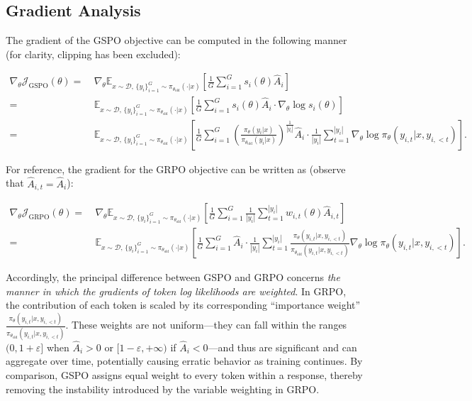 \subsection{Gradient Analysis}
\label{subsec:gradient}

The gradient of the GSPO objective can be computed in the following manner (for clarity, clipping has been excluded):

\begin{align}
\nabla_{\theta} \mathcal{J}_\text{GSPO} (\theta)
=&\ 
\nabla_{\theta} \mathbb{E}_{ x \sim \mathcal{D},\, \{y_i\}_{i=1}^G \sim \pi_{\theta_\text{old}}( \cdot | x) }
\left[ 
\frac{1}{G} \sum_{i=1}^{G} s_{i}(\theta) \widehat{A}_{i}
\right] \\
= &\ 
\mathbb{E}_{ x \sim \mathcal{D},\, \{y_i\}_{i=1}^G \sim \pi_{\theta_\text{old}}( \cdot | x) }
\left[ 
\frac{1}{G} \sum_{i=1}^{G}
s_{i}(\theta) \widehat{A}_{i}
\cdot \nabla_{\theta} \log s_{i}(\theta)
\right] \\
=&\ 
\mathbb{E}_{ x \sim \mathcal{D},\, \{y_i\}_{i=1}^G \sim \pi_{\theta_\text{old}}( \cdot | x) }
\left[ 
\frac{1}{G} \sum_{i=1}^{G} 
\left( \frac{ \pi_{\theta} (y_i | x) }{ \pi_{\theta_\text{old}} (y_i | x)} \right)^{\frac{1}{|y_i|}} \widehat{A}_{i} 
\cdot \frac{1}{|y_i|} \sum_{t=1}^{|y_i|} \nabla_{\theta} \log \pi_{\theta} (y_{i,t} | x, y_{i,<t}) 
\right].
\label{equ:gspo_grad}
\end{align}

For reference, the gradient for the GRPO objective can be written as (observe that $\widehat{A}_{i,t} = \widehat{A}_{i}$):

\begin{align}
\nabla_{\theta} \mathcal{J}_\text{GRPO} (\theta) 
=&\ 
\nabla_{\theta} \mathbb{E}_{ x \sim \mathcal{D},\, \{y_i\}_{i=1}^G \sim \pi_{\theta_\text{old}}( \cdot | x) }
\left[ \frac{1}{G} \sum_{i=1}^{G} \frac{1}{|y_i|} \sum_{t=1}^{|y_i|} 
w_{i,t}(\theta) \widehat{A}_{i,t}
\right] \\
=&\
\mathbb{E}_{ x \sim \mathcal{D},\, \{y_i\}_{i=1}^G \sim \pi_{\theta_\text{old}}( \cdot | x) }
\left[ \frac{1}{G} \sum_{i=1}^{G} \widehat{A}_{i} 
\cdot \frac{1}{|y_i|} \sum_{t=1}^{|y_i|} 
\frac{ \pi_{\theta} (y_{i,t} | x, y_{i,<t}) }{ \pi_{\theta_\text{old}} (y_{i,t} | x,y_{i,<t})} 
\nabla_{\theta} \log \pi_{\theta} (y_{i,t} | x, y_{i,<t})  
\right].
\end{align}

Accordingly, the principal difference between GSPO and GRPO concerns \textit{the manner in which the gradients of token log likelihoods are weighted}. In GRPO, the contribution of each token is scaled by its corresponding ``importance weight'' $\frac{ \pi_{\theta} (y_{i,t} | x, y_{i,<t}) }{ \pi_{\theta_\text{old}} (y_{i,t} | x,y_{i,<t})}$. These weights are not uniform—they can fall within the ranges $(0, 1+\varepsilon]$ when $\widehat{A}_{i} > 0$ or $[1-\varepsilon, +\infty)$ if $\widehat{A}_{i} < 0$—and thus are significant and can aggregate over time, potentially causing erratic behavior as training continues. By comparison, GSPO assigns equal weight to every token within a response, thereby removing the instability introduced by the variable weighting in GRPO.

